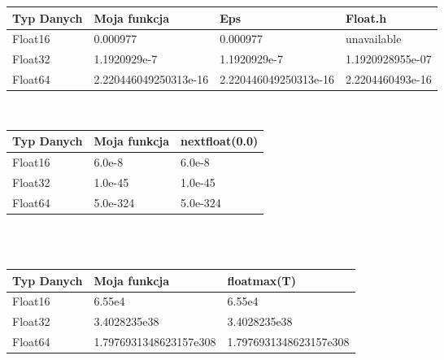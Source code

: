 \documentclass[11pt]{article}
\begin{document}
\setlength{\tabcolsep}{2pt}
\renewcommand{\arraystretch}{1.3}
\begin{tabularx}{\textwidth}{|l|p{3.5cm}|p{3.5cm}|X|}
\hline
Typ Danych & Moja funkcja & Eps & Float.h \\
\hline
Float16 & 0.000977 & 0.000977 & unavailable \\
\hline
Float32 & 1.1920929e-7 & 1.1920929e-7 & 1.1920928955e-07 \\
\hline
Float64 & 2.220446049250313e-16 & 2.220446049250313e-16 & 2.2204460493e-16\\
\hline
\end{tabularx}
\vspace{25pt} \\
\setlength{\tabcolsep}{2pt}
\renewcommand{\arraystretch}{1.3}
\begin{tabularx}{\textwidth}{|l|X|X|}
\hline
Typ Danych & Moja funkcja & nextfloat(0.0)\\
\hline
Float16 & 6.0e-8 & 6.0e-8 \\
\hline
Float32 & 1.0e-45 & 1.0e-45 \\
\hline
Float64 & 5.0e-324 & 5.0e-324 \\
\hline
\end{tabularx} \\
\vspace{25pt} \\
\setlength{\tabcolsep}{2pt}
\renewcommand{\arraystretch}{1.3}
\begin{tabularx}{\textwidth}{|l|X|X|}
\hline
Typ Danych & Moja funkcja & floatmax(T)\\
\hline
Float16 & 6.55e4 & 6.55e4 \\
\hline
Float32 & 3.4028235e38 & 3.4028235e38 \\
\hline
Float64 & 1.7976931348623157e308 & 1.7976931348623157e308 \\
\hline
\end{tabularx} \\
\end{document}
